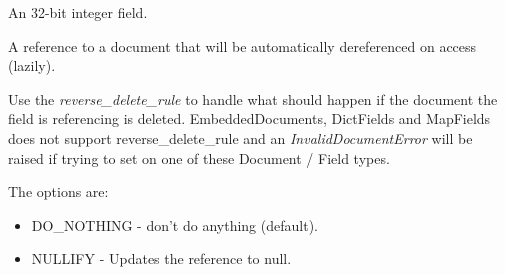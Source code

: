 \documentclass[letterpaper,10pt,english]{sphinxmanual}
\begin{document}
\begin{fulllineitems}
\begin{fulllineitems}
\label{app:app.models.Score.objects}
\end{fulllineitems}


\begin{fulllineitems}
\label{app:app.models.Score.score}
An 32-bit integer field.

\end{fulllineitems}


\begin{fulllineitems}
\label{app:app.models.Score.user}
A reference to a document that will be automatically dereferenced on
access (lazily).

Use the \emph{reverse\_delete\_rule} to handle what should happen if the document
the field is referencing is deleted.  EmbeddedDocuments, DictFields and
MapFields does not support reverse\_delete\_rule and an \emph{InvalidDocumentError}
will be raised if trying to set on one of these Document / Field types.

The options are:
\begin{itemize}
\item {} 
DO\_NOTHING  - don't do anything (default).

\item {} 
NULLIFY     - Updates the reference to null.


\end{itemize}
\end{fulllineitems}
\end{fulllineitems}
\end{document}
